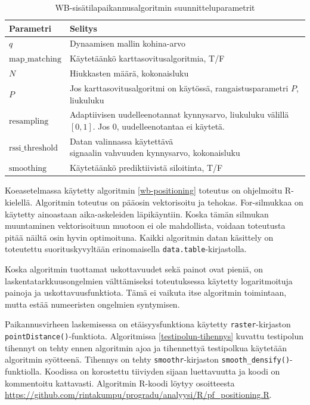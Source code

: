 \documentclass[
  12pt,
  a4paper, twoside]{book}
\begin{document}
\begin{table}

\caption{\label{tab:wb-parametrit}WB-sisätilapaikannusalgoritmin suunnitteluparametrit}
\centering
\begin{tabular}[t]{ll}
\toprule
Parametri & Selitys\\
\midrule
$q$ & Dynaamisen mallin kohina-arvo\\
$\text{map\_matching}$ & Käytetäänkö karttasovitusalgoritmia, T/F\\
$N$ & Hiukkasten määrä, kokonaisluku\\
$P$ & \makecell[l]{Jos karttasovitusalgoritmi on käytössä,\\ rangaistusparametri $P$, liukuluku}\\
$\text{resampling}$ & \makecell[l]{Adaptiivisen uudelleenotannat kynnysarvo,\\ liukuluku välillä $[0,1]$. Jos $0$, uudelleenotantaa ei käytetä.}\\
\addlinespace
$\text{rssi\_threshold}$ & \makecell[l]{Datan valinnassa käytettävä\\ signaalin vahvuuden kynnysarvo, kokonaisluku}\\
$\text{smoothing}$ & Käytetäänkö prediktiivistä siloitinta, T/F\\
\bottomrule
\end{tabular}
\end{table}

Koeasetelmassa käytetty algoritmin \ref{wb-positioning} toteutus on ohjelmoitu R-kielellä. Algoritmin toteutus on pääosin vektorisoitu ja tehokas. For-silmukkaa on käytetty ainoastaan aika-askeleiden läpikäyntiin. Koska tämän silmukan muuntaminen vektorisoituun muotoon ei ole mahdollista, voidaan toteutusta pitää näiltä osin hyvin optimoituna. Kaikki algoritmin datan käsittely on toteutettu suorituskyvyltään erinomaisella \texttt{data.table}-kirjastolla.

Koska algoritmin tuottamat uskottavuudet sekä painot ovat pieniä, on laskentatarkkuusongelmien välttämiseksi toteutuksessa käytetty logaritmoituja painoja ja uskottavuusfunktiota. Tämä ei vaikuta itse algoritmin toimintaan, mutta estää numeeristen ongelmien syntymisen.

Paikannusvirheen laskemisessa on etäisyysfunktiona käytetty \texttt{raster}-kirjaston \texttt{pointDistance()}-funktiota. Algoritmissa \ref{testipolun-tihennys} kuvattu testipolun tihennyt on tehty ennen algoritmin ajoa ja tihennettyä testipolkua käytetään algoritmin syötteenä. Tihennys on tehty \texttt{smoothr}-kirjaston \texttt{smooth\_densify()}-funktiolla. Koodissa on korostettu tiiviyden sijaan luettavuutta ja koodi on kommentoitu kattavasti. Algoritmin R-koodi löytyy osoitteesta \url{https://github.com/rintakumpu/progradu/analyysi/R/pf_positioning.R}.
\end{document}
